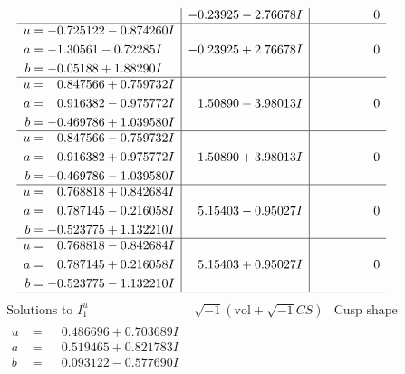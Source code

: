 \documentclass[1p]{elsarticle_modified}
\theoremstyle{definition}
\newcommand{\I}{\sqrt{-1}}
\begin{document}
$$\begin{array}{c|c|c}
 & -0.23925 - 2.76678 I & \phantom{-0.000000 } 0 \\ \hline\begin{aligned}
u &= -0.725122 - 0.874260 I \\
a &= -1.30561 - 0.72285 I \\
b &= -0.05188 + 1.88290 I\end{aligned}
 & -0.23925 + 2.76678 I & \phantom{-0.000000 } 0 \\ \hline\begin{aligned}
u &= \phantom{-}0.847566 + 0.759732 I \\
a &= \phantom{-}0.916382 - 0.975772 I \\
b &= -0.469786 + 1.039580 I\end{aligned}
 & \phantom{-}1.50890 - 3.98013 I & \phantom{-0.000000 } 0 \\ \hline\begin{aligned}
u &= \phantom{-}0.847566 - 0.759732 I \\
a &= \phantom{-}0.916382 + 0.975772 I \\
b &= -0.469786 - 1.039580 I\end{aligned}
 & \phantom{-}1.50890 + 3.98013 I & \phantom{-0.000000 } 0 \\ \hline\begin{aligned}
u &= \phantom{-}0.768818 + 0.842684 I \\
a &= \phantom{-}0.787145 - 0.216058 I \\
b &= -0.523775 + 1.132210 I\end{aligned}
 & \phantom{-}5.15403 - 0.95027 I & \phantom{-0.000000 } 0 \\ \hline\begin{aligned}
u &= \phantom{-}0.768818 - 0.842684 I \\
a &= \phantom{-}0.787145 + 0.216058 I \\
b &= -0.523775 - 1.132210 I\end{aligned}
 & \phantom{-}5.15403 + 0.95027 I & \phantom{-0.000000 } 0\\
 \hline 
 \end{array}$$\newpage$$\begin{array}{c|c|c}  
\text{Solutions to }I^u_{1}& \I (\text{vol} + \sqrt{-1}CS) & \text{Cusp shape}\\
 \hline 
\begin{aligned}
u &= \phantom{-}0.486696 + 0.703689 I \\
a &= \phantom{-}0.519465 + 0.821783 I \\
b &= \phantom{-}0.093122 - 0.577690 I\end{aligned}

\end{array}$$
\end{document}
